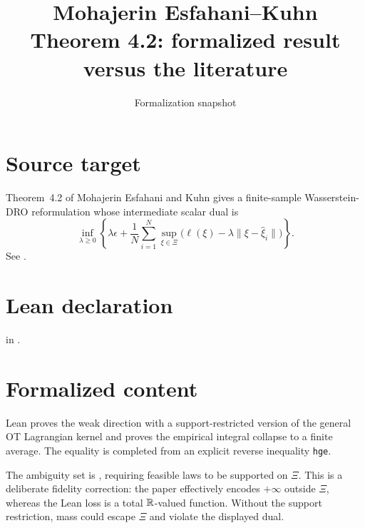 \title{Mohajerin Esfahani--Kuhn Theorem 4.2: formalized result versus the literature}
\author{}
\date{Formalization snapshot \snapshot}

\maketitle
{}
\section{Source target}
Theorem~4.2 of Mohajerin Esfahani and Kuhn gives a finite-sample Wasserstein-DRO reformulation whose intermediate scalar dual is
\[
 \inf_{\lambda\ge0}\left\{\lambda\epsilon+
 \frac1N\sum_{i=1}^N\sup_{\xi\in\Xi}
 \bigl(\ell(\xi)-\lambda\lVert\xi-\widehat\xi_i\rVert\bigr)\right\}.
\]
See .

\section{Lean declaration}
 in
.

\section{Formalized content}
Lean proves the weak direction with a support-restricted version of the general OT Lagrangian kernel and proves the empirical integral collapse to a finite average.  The equality is completed from an explicit reverse inequality \texttt{hge}.

The ambiguity set is , requiring feasible laws to be supported on $\Xi$.  This is a deliberate fidelity correction: the paper effectively encodes $+\infty$ outside $\Xi$, whereas the Lean loss is a total $\mathbb{R}$-valued function.  Without the support restriction, mass could escape $\Xi$ and violate the displayed dual.

